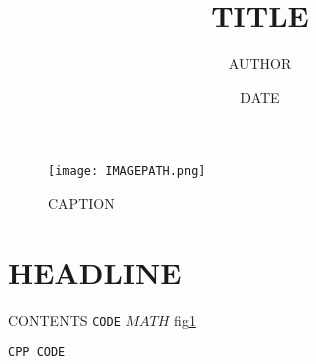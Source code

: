 \documentclass[11pt]{article}
\title{TITLE}
\author{AUTHOR}
\date{DATE}
\begin{document}
\maketitle

\begin{figure}[h] %
    \centering
    \texttt{[image: IMAGEPATH.png]}
    \caption{CAPTION}
    \label{fig:LABEL}
\end{figure}

\section{HEADLINE}
CONTENTS \texttt{CODE} $MATH$ fig\ref{fig:LABEL}

\begin{lstlisting}[frame=single,caption={CAPTION}]
CPP CODE
\end{lstlisting}
\end{document}
